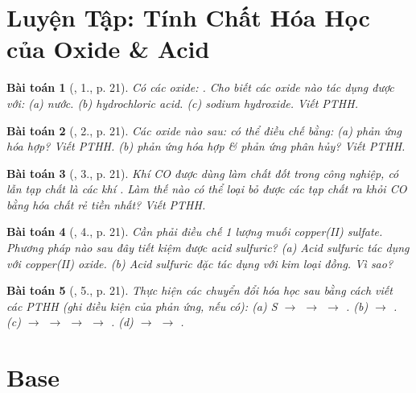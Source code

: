 \documentclass{article}
\newtheorem{baitoan}{Bài toán}
\begin{document}
\section{Luyện Tập: Tính Chất Hóa Học của Oxide \& Acid}

\begin{baitoan}[\cite{SGK_Hoa_Hoc_9}, 1., p. 21]
	Có các oxide: {\rm{}}. Cho biết các oxide nào tác dụng được với: (a) nước. (b) hydrochloric acid. (c) sodium hydroxide. Viết {\rm PTHH}.
\end{baitoan}

\begin{baitoan}[\cite{SGK_Hoa_Hoc_9}, 2., p. 21]
	Các oxide nào sau: {\rm{}} có thể điều chế bằng: (a) phản ứng hóa hợp? Viết PTHH. (b) phản ứng hóa hợp \& phản ứng phân hủy? Viết PTHH.
\end{baitoan}

\begin{baitoan}[\cite{SGK_Hoa_Hoc_9}, 3., p. 21]
	Khí {\rm CO} được dùng làm chất đốt trong công nghiệp, có lẫn tạp chất là các khí {\rm{}}. Làm thế nào có thể loại bỏ được các tạp chất ra khỏi {\rm CO} bằng hóa chất rẻ tiền nhất? Viết {\rm PTHH}.
\end{baitoan}

\begin{baitoan}[\cite{SGK_Hoa_Hoc_9}, 4., p. 21]
	Cần phải điều chế 1 lượng muối copper(II) sulfate. Phương pháp nào sau đây tiết kiệm được acid sulfuric? (a) Acid sulfuric tác dụng với copper(II) oxide. (b) Acid sulfuric đặc tác dụng với kim loại đồng. Vì sao?
\end{baitoan}

\begin{baitoan}[\cite{SGK_Hoa_Hoc_9}, 5., p. 21]
	Thực hiện các chuyển đổi hóa học sau bằng cách viết các {\rm PTHH} (ghi điều kiện của phản ứng, nếu có): (a) {\rm S $\to$  $\to$  $\to$ }. (b) {\rm{} $\to$ }. (c) {\rm{} $\to$  $\to$  $\to$  $\to$ }. (d) {\rm{} $\to$  $\to$ }.
\end{baitoan}


\section{Base}
\end{document}
